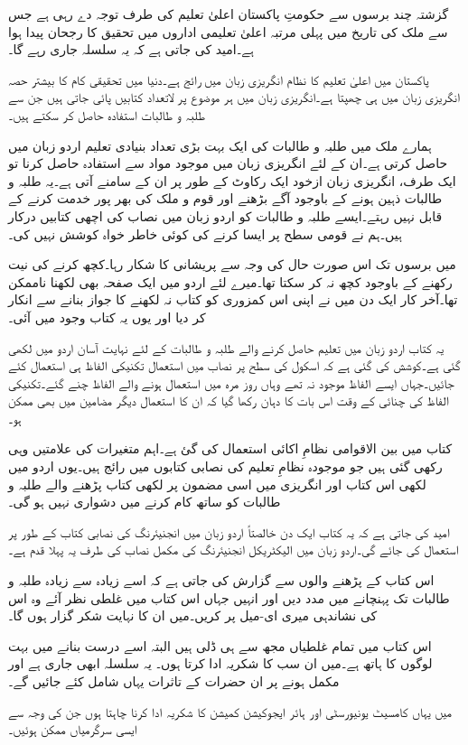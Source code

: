 گزشتہ چند برسوں سے حکومتِ پاکستان اعلیٰ تعلیم کی طرف توجہ دے رہی ہے جس سے ملک کی تاریخ میں پہلی مرتبہ اعلیٰ تعلیمی اداروں میں تحقیق کا رجحان پیدا ہوا ہے۔امید کی جاتی ہے کہ یہ سلسلہ جاری رہے گا۔

پاکستان میں اعلیٰ تعلیم کا نظام انگریزی زبان میں رائج ہے۔دنیا میں تحقیقی کام کا بیشتر حصہ انگریزی زبان میں ہی چھپتا ہے۔انگریزی زبان میں ہر موضوع پر لاتعداد کتابیں پائی جاتی ہیں جن سے طلبہ و طالبات استفادہ حاصل کر سکتے ہیں۔

ہمارے ملک میں طلبہ و طالبات کی ایک بہت بڑی تعداد بنیادی تعلیم اردو زبان میں حاصل کرتی ہے۔ان کے لئے انگریزی زبان میں موجود مواد سے استفادہ حاصل کرنا تو ایک طرف، انگریزی زبان ازخود ایک رکاوٹ کے طور پر ان کے سامنے آتی ہے۔یہ طلبہ و طالبات ذہین ہونے کے باوجود آگے بڑھنے اور قوم و ملک کی بھر پور خدمت کرنے کے قابل نہیں رہتے۔ایسے طلبہ و طالبات کو اردو زبان میں نصاب کی اچھی کتابیں درکار ہیں۔ہم نے قومی سطح پر ایسا کرنے کی کوئی خاطر خواہ کوشش نہیں کی۔ 

میں برسوں تک اس صورت حال کی وجہ سے پریشانی کا شکار رہا۔کچھ کرنے کی نیت رکھنے کے باوجود کچھ نہ کر سکتا تھا۔میرے لئے اردو میں ایک صفحہ بھی لکھنا ناممکن تھا۔آخر کار ایک دن میں نے اپنی اس کمزوری کو کتاب نہ لکھنے کا جواز بنانے سے انکار کر دیا اور یوں یہ کتاب وجود میں آئی۔

یہ کتاب اردو زبان میں تعلیم حاصل کرنے والے طلبہ و طالبات کے لئے نہایت آسان اردو میں لکھی گئی ہے۔کوشش کی گئی ہے کہ اسکول کی سطح پر نصاب میں استعمال تکنیکی الفاظ ہی استعمال کئے جائیں۔جہاں ایسے الفاظ موجود نہ تھے وہاں روز مرہ میں استعمال ہونے والے الفاظ چنے گئے۔تکنیکی الفاظ کی چنائی کے وقت اس بات کا دہان رکھا گیا کہ ان کا استعمال دیگر مضامین میں بھی ممکن ہو۔

کتاب میں بین الاقوامی نظامِ اکائی استعمال کی گئ ہے۔اہم متغیرات کی علامتیں وہی رکھی گئی ہیں جو موجودہ نظامِ تعلیم کی نصابی کتابوں میں رائج ہیں۔یوں اردو میں لکھی اس کتاب اور انگریزی میں اسی مضمون پر لکھی کتاب پڑھنے والے طلبہ و طالبات کو ساتھ کام کرنے میں دشواری نہیں ہو گی۔ 

امید کی جاتی ہے کہ یہ کتاب ایک دن خالصتاً اردو زبان میں انجنیئرنگ کی نصابی کتاب کے طور پر استعمال کی جائے گی۔اردو زبان میں الیکٹریکل انجنیئرنگ کی مکمل نصاب کی طرف یہ پہلا قدم ہے۔ 

اس کتاب کے پڑھنے والوں سے گزارش کی جاتی ہے کہ اسے زیادہ سے زیادہ طلبہ و طالبات تک پہنچانے میں مدد دیں اور انہیں جہاں اس کتاب میں غلطی نظر آئے وہ اس کی نشاندہی میری ای-میل پر کریں۔میں ان کا نہایت شکر گزار ہوں گا۔

اس کتاب میں تمام غلطیاں مجھ سے ہی ڈلی ہیں البتہ اسے درست بنانے میں بہت لوگوں کا ہاتھ ہے۔میں ان سب کا شکریہ ادا کرتا ہوں۔ یہ سلسلہ ابھی جاری ہے اور مکمل ہونے پر ان حضرات کے تاثرات یہاں شامل کئے جائیں گے۔  

میں یہاں کامسیٹ یونیورسٹی اور ہائر ایجوکیشن کمیشن کا شکریہ ادا کرنا چاہتا ہوں جن کی وجہ سے ایسی سرگرمیاں ممکن ہوئیں۔	
\vspace{5mm}

{}
